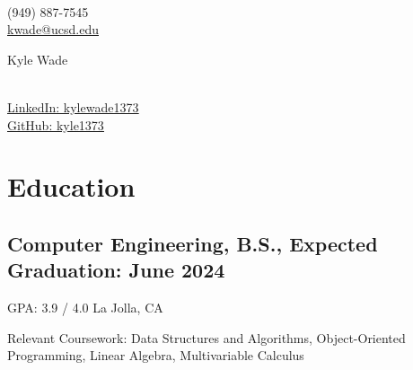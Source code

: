 \documentclass[a4,10pt]{article}
\newcommand{\subtext}[1]{
#1\par\vspace{-0.2cm}}
\begin{document}
\begin{center}
    \begin{minipage}[b]{0.24\textwidth}
            \large \\
            \normalsize (949) 887-7545 \\
            \normalsize
            \href{mailto:kwade@ucsd.edu}{kwade@ucsd.edu} 
    \end{minipage}%
    \begin{minipage}[b]{0.5\textwidth}
            \centering
            {\HUGE Kyle Wade} \\ %
            \vspace{0.1cm}
            {\color{UI_blue} \Large{}} \\
    \end{minipage}%
    \begin{minipage}[b]{0.24\textwidth}
            \flushright \normalsize  %
            {\href{https://www.linkedin.com/in/kylewade1373/}{\underline{\textcolor{linkblue}{LinkedIn: kylewade1373}}} } \\
            \vspace{.05cm}
            \href{https://github.com/kyle1373}{\underline{\textcolor{linkblue}{GitHub: kyle1373}}}
    \end{minipage} 
    \vspace{-0.45cm} 
\end{center}

\section{Education}
\subsection*{Computer Engineering, B.S., {\normalsize {}} \hfill Expected Graduation: June 2024}
\newline
{GPA: 3.9 / 4.0 \hfill La Jolla, CA}
\newline
\subtext{Relevant Coursework: Data Structures and Algorithms, Object-Oriented Programming, Linear Algebra, Multivariable Calculus}
\vspace{-.05cm}
\end{document}
